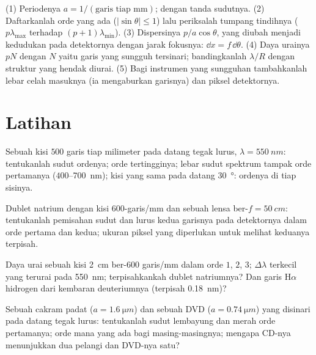 \begin{method}\label{met:b2:gratings:method}
(1) Periodenya $a = 1/(\text{garis tiap mm})$;  dengan
tanda sudutnya. (2) Daftarkanlah orde yang ada ($|\sin\theta| \le 1$)
lalu periksalah tumpang tindihnya ($p\lambda_{\max}$ terhadap $(p + 1)\lambda_{\min}$). (3)
Dispersinya $p/a\cos\theta$, yang diubah menjadi kedudukan pada detektornya dengan
jarak fokusnya: $\dd x = f\,\dd\theta$. (4) Daya urainya $pN$ dengan $N$ yaitu
garis yang sungguh tersinari; bandingkanlah $\lambda/R$ dengan struktur yang hendak
diurai. (5) Bagi instrumen yang sungguhan tambahkanlah lebar celah masuknya (ia
mengaburkan garisnya) dan piksel detektornya.
\end{method}

\section{Latihan}

\begin{exercise}[$\star$]\label{exo:b2:gratings:1}
Sebuah kisi $500$ garis tiap milimeter pada datang tegak lurus, $\lambda =
\qty{550}{nm}$: tentukanlah sudut ordenya; orde tertingginya; lebar sudut
spektrum tampak orde pertamanya ($400$--\qty{700}{nm}); kisi yang sama pada
datang \qty{30}{\degree}: ordenya di tiap sisinya.
\end{exercise}

\begin{exercise}[$\star$]\label{exo:b2:gratings:2}
Dublet natrium dengan kisi $600$-garis/mm dan sebuah lensa ber-$f =
\qty{50}{cm}$: tentukanlah pemisahan sudut dan lurus kedua garisnya pada
detektornya dalam orde pertama dan kedua; ukuran piksel yang diperlukan untuk melihat
keduanya terpisah.
\end{exercise}

\begin{exercise}[$\star$]\label{exo:b2:gratings:3}
Daya urai sebuah kisi \qty{2}{cm} ber-$600$ garis/mm dalam orde $1$, $2$,
$3$; $\Delta\lambda$ terkecil yang terurai pada \qty{550}{nm}; terpisahkankah dublet
natriumnya? Dan garis H$\alpha$ hidrogen dari kembaran deuteriumnya (terpisah
\qty{0.18}{nm})?
\end{exercise}

\begin{exercise}[$\star$]\label{exo:b2:gratings:4}
Sebuah cakram padat ($a = \qty{1.6}{\micro m}$) dan sebuah DVD ($a = \qty{0.74}{\micro m}$) yang disinari pada
datang tegak lurus: tentukanlah sudut lembayung dan merah orde pertamanya; orde mana yang
ada bagi masing-masingnya; mengapa CD-nya menunjukkan dua pelangi dan DVD-nya satu?
\end{exercise}

